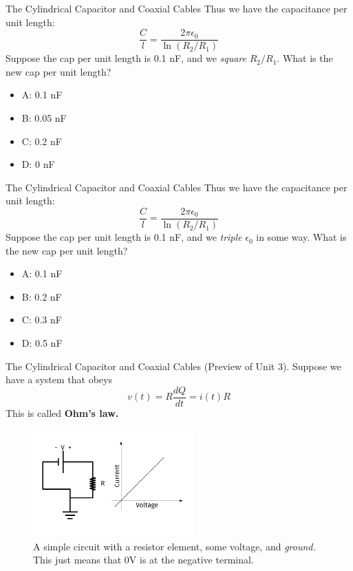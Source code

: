 \documentclass{beamer}
\begin{document}
\begin{frame}{The Cylindrical Capacitor and Coaxial Cables}
Thus we have the capacitance per unit length:
\begin{equation}
\boxed{
\frac{C}{l} = \frac{2\pi\epsilon_0}{\ln(R_2/R_1)}
}
\end{equation}
Suppose the cap per unit length is 0.1 nF, and we \textit{square} $R_2/R_1$.  What is the new cap per unit length?
\begin{itemize}
\item A: 0.1 nF
\item B: 0.05 nF
\item C: 0.2 nF
\item D: 0 nF
\end{itemize}
\end{frame}

\begin{frame}{The Cylindrical Capacitor and Coaxial Cables}
Thus we have the capacitance per unit length:
\begin{equation}
\boxed{
\frac{C}{l} = \frac{2\pi\epsilon_0}{\ln(R_2/R_1)}
}
\end{equation}
Suppose the cap per unit length is 0.1 nF, and we \textit{triple} $\epsilon_0$ in some way.  What is the new cap per unit length?
\begin{itemize}
\item A: 0.1 nF
\item B: 0.2 nF
\item C: 0.3 nF
\item D: 0.5 nF
\end{itemize}
\end{frame}

\begin{frame}{The Cylindrical Capacitor and Coaxial Cables}
(Preview of Unit 3).  Suppose we have a system that obeys
\begin{equation}
v(t) = R \frac{dQ}{dt} = i(t) R
\end{equation}
This is called \textbf{Ohm's law.}
\begin{figure}
\centering
\includegraphics[width=0.55\textwidth]{figures/iVCurve.pdf}
\caption{\label{fig:iv} A simple circuit with a resistor element, some voltage, and \textit{ground.} This just means that 0V is at the negative terminal.}
\end{figure}
\end{frame}
\end{document}
